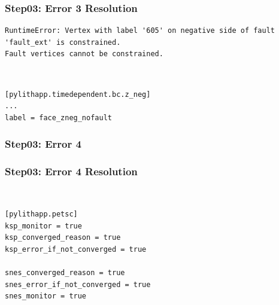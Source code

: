 \documentclass{beamer}
\begin{document}
\begin{frame}[fragile]
  \frametitle{Step03: Error 3 Resolution}

\begin{lstlisting}
RuntimeError: Vertex with label '605' on negative side of fault 'fault_ext' is constrained.
Fault vertices cannot be constrained.
\end{lstlisting}\pause
{} \pause\\
\begin{lstlisting}
[pylithapp.timedependent.bc.z_neg]
...
label = face_zneg_nofault
\end{lstlisting}

\end{frame}


\begin{frame}[fragile]
  \frametitle{Step03: Error 4}

  \begin{center}
  \end{center}
  
\end{frame}


\begin{frame}[fragile]
  \frametitle{Step03: Error 4 Resolution}

 \pause\\
\begin{lstlisting}
[pylithapp.petsc]
ksp_monitor = true
ksp_converged_reason = true
ksp_error_if_not_converged = true

snes_converged_reason = true
snes_error_if_not_converged = true
snes_monitor = true
\end{lstlisting}

\end{frame}
\end{document}

